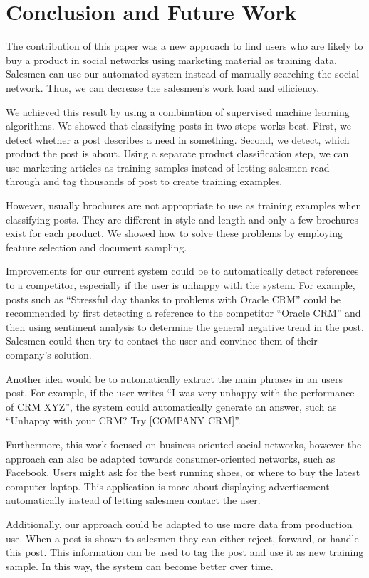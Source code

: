 \section{Conclusion and Future Work}
\label{sec:conclusion}

The contribution of this paper was a new approach to find users who are likely to buy a product in social networks using marketing material as training data.
Salesmen can use our automated system instead of manually searching the social network.
Thus, we can decrease the salesmen's work load and efficiency.

We achieved this result by using a combination of supervised machine learning algorithms.
We showed that classifying posts in two steps works best.
First, we detect whether a post describes a need in something.
Second, we detect, which product the post is about.
Using a separate product classification step, we can use marketing articles as training samples instead of letting salesmen read through and tag thousands of post to create training examples.

However, usually brochures are not appropriate to use as training examples when classifying posts.
They are different in style and length and only a few brochures exist for each product.
We showed how to solve these problems by employing feature selection and document sampling.

Improvements for our current system could be to automatically detect references to a competitor, especially if the user is unhappy with the system.
For example, posts such as ``Stressful day thanks to problems with Oracle CRM'' could be recommended by first detecting a reference to the competitor ``Oracle CRM'' and then using sentiment analysis to determine the general negative trend in the post.
Salesmen could then try to contact the user and convince them of their company's solution.

Another idea would be to automatically extract the main phrases in an users post.
For example, if the user writes ``I was very unhappy with the performance of CRM XYZ'', the system could automatically generate an answer, such as ``Unhappy with your CRM? Try [COMPANY CRM]''.

Furthermore, this work focused on business-oriented social networks, however the approach can also be adapted towards consumer-oriented networks, such as Facebook.
Users might ask for the best running shoes, or where to buy the latest computer laptop.
This application is more about displaying advertisement automatically instead of letting salesmen contact the user.

Additionally, our approach could be adapted to use more data from production use.
When a post is shown to salesmen they can either reject, forward, or handle this post.
This information can be used to tag the post and use it as new training sample.
In this way, the system can become better over time.
